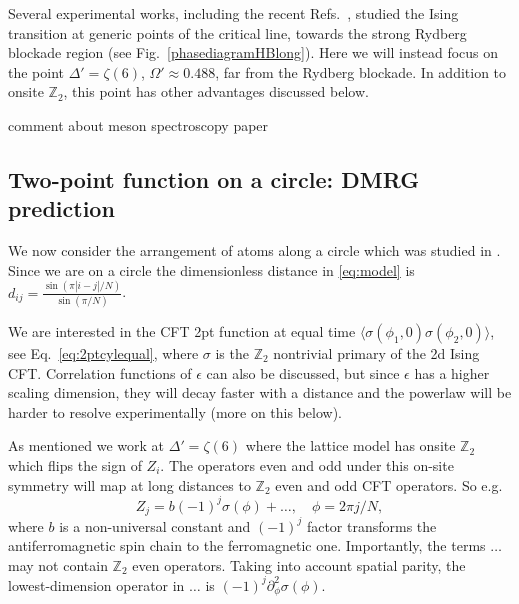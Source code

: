 \documentclass[a4paper,11pt]{article}
\theoremstyle{remark}
\theoremstyle{theorem}
\begin{document}
Several experimental works, including the recent Refs.~\cite{Fang:2024uyf,Sun:2026aqf}, studied the Ising transition at generic points of the critical line, towards the strong Rydberg blockade region (see Fig.~\ref{phasediagramHBlong}). Here we will instead focus on the point $\Delta'=\zeta(6)$, $\Omega'\approx 0.488$, far from the Rydberg blockade. In addition to onsite $\mathbb{Z}_2$, this point has other advantages discussed below. 

{\color{red} comment about meson spectroscopy paper}

\subsection{Two-point function on a circle: DMRG prediction}

We now consider the arrangement of atoms along a circle which was studied in \cite{Fang:2024uyf,Emperauger:2025raf}.
Since we are on a circle the dimensionless distance in \eqref{eq:model} is $d_{ij}=\frac{\sin(\pi |i-j|/N)}{\sin(\pi/N)}$.

We are interested in the CFT 2pt function at equal time $\langle \sigma(\phi_1,0)\sigma(\phi_2,0)\rangle$, see Eq.~\eqref{eq:2ptcylequal}, where $\sigma$ is the $\mathbb{Z}_2$ nontrivial primary of the 2d Ising CFT. Correlation functions of $\epsilon$ can also be discussed, but since $\epsilon$ has a higher scaling dimension, they will decay faster with a distance and the powerlaw will be harder to resolve experimentally (more on this below).

As mentioned we work at $\Delta'=\zeta(6)$ where the lattice model has onsite $\mathbb{Z}_2$ which flips the sign of $Z_i$. The operators even and odd under this on-site symmetry will map at long distances to $\mathbb{Z}_2$ even and odd CFT operators. So e.g.
\begin{equation}
Z_j = b (-1)^j \sigma(\phi) +\ldots,\quad \phi=2\pi j/N,
\end{equation} 
where $b$ is a non-universal constant and $(-1)^j$ factor transforms the antiferromagnetic spin chain to the ferromagnetic one. Importantly, the terms $\ldots$ may not contain $\mathbb{Z}_2$ even operators. Taking into account spatial parity, the lowest-dimension operator in $\ldots$ is $(-1)^j \partial_\phi^2 \sigma(\phi)$.
\end{document}
